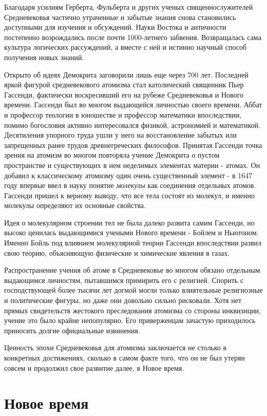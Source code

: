 Благодаря усилиям Герберта, Фульберта и других ученых священнослужителей Средневековья частично утраченные и забытые знания снова становились доступными для изучения и обсуждений.
Науки Востока и античности постепенно возрождались после почти 1000-летнего забвения.
Возвращалась сама культура логических рассуждений, а вместе с ней и истинно научный способ получения новых знаний.

Открыто об идеях Демокрита заговорили лишь еще через 700 лет.
Последней яркой фигурой средневекового атомизма стал католический священник Пьер Гассенди, фактически воскресивший его на рубеже Средневековья и Нового времени.
Гассенди был во многом выдающейся личностью своего времени. 
Аббат и профессор теологии в юношестве и профессор математики впоследствии, помимо богословия активно интересовался физикой, астрономией и математикой. 
Десятиления упорного труда ушли у него на восстановление забытых или запрещенных ранее трудов древнегреческих философов. 
Принятая Гассенди точка зрения на атомизм во многом повторяла учение Демокрита о пустом пространстве и существующих в нем неделимых элементах материи - атомах. 
Он добавил к классическому атомизму один очень существенный элемент - в 1647 году впервые ввел в науку понятие \textit{молекулы} как соединения отдельных атомов. 
Гассенди пришел к верному выводу, что все тела состоят из молекул, и именно молекулы определяют их основные свойства.

Идея о молекулярном строении тел не была далеко развита самим Гассенди, но высоко ценилась выдающимися учеными Нового времени - Бойлем и Ньютоном.
Именно Бойль под влиянием молекулярной теории Гассенди впоследствии развил свою теорию, объясняющую физические и химические явления в газах.    

Распространение учения об атоме в Средневековье во многом обязано отдельным выдающимся личностям, пытавшимся примирить его с религией.
Спорить с господствующей более тысячи лет догмой могли только влиятельные религиозные и политические фигуры, но даже они довольно сильно рисковали.
Хотя нет прямых свидетельств жестокого преследования атомизма со стороны инквизиции, учение это было крайне непопулярно.
Его приверженцам зачастую приходилось приносить долгие официальные извинения.

Ценность эпохи Средневековья для атомизма заключается не столько в конкретных достижениях, сколько в самом факте того, что он не был утерян совсем и продолжил свое развитие далее, в Новое время.


\section*{Новое время}

